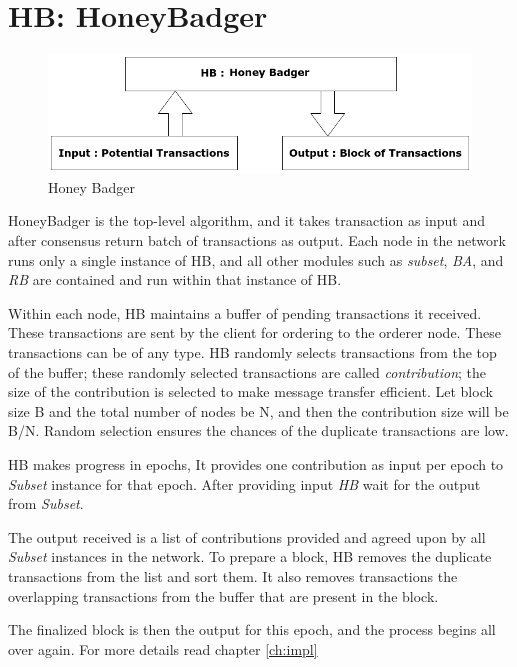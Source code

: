 \section{HB:  HoneyBadger}
\label{sec:HB_1}
\begin{figure}[!h]
    \centering
    \includegraphics[scale=0.7]{images/QHB.png}
    \caption{Honey Badger\cite{POANetwork}}
    \label{fig:qhb}
\end{figure}
HoneyBadger\cite{POANetwork} is the top-level algorithm, and it takes transaction as input and after consensus return batch of transactions as output. Each node in the network runs only a single instance of HB, and all other modules such as \textit{subset}, \textit{BA}, and \textit{RB} are contained and run within that instance of HB.

Within each node, HB maintains a buffer of pending transactions it received. These transactions are sent by the client for ordering to the orderer node.
These transactions can be of any type.
HB  randomly selects transactions from the top of the buffer; these randomly selected transactions are called \textit{contribution}; the size of the contribution is selected to make message transfer efficient. Let block size B and the total number of nodes be N, and then the contribution size will be B/N. Random selection ensures the chances of the duplicate transactions are low.

HB makes progress in epochs, It provides one contribution as input per epoch to \textit{Subset} instance for that epoch. After providing input \textit{HB} wait for the output from \textit{Subset}.

The output received is a list of contributions provided and agreed upon by all \textit{Subset} instances in the network. To prepare a block, HB removes the duplicate transactions from the list and sort them. It also removes transactions the overlapping transactions from the buffer that are present in the block.

The finalized block is then the output for this epoch, and the process begins all over again.
For more details read chapter \ref{ch:impl}

